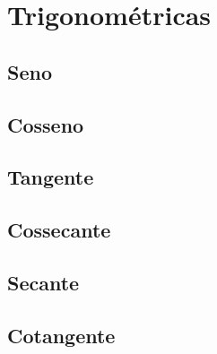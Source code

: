 \section{Trigonométricas}
\blindtext
\subsection{Seno}
\blindtext
\subsection{Cosseno}
\blindtext
\subsection{Tangente}
\blindtext
\subsection{Cossecante}
\blindtext
\subsection{Secante}
\blindtext
\subsection{Cotangente}
\blindtext